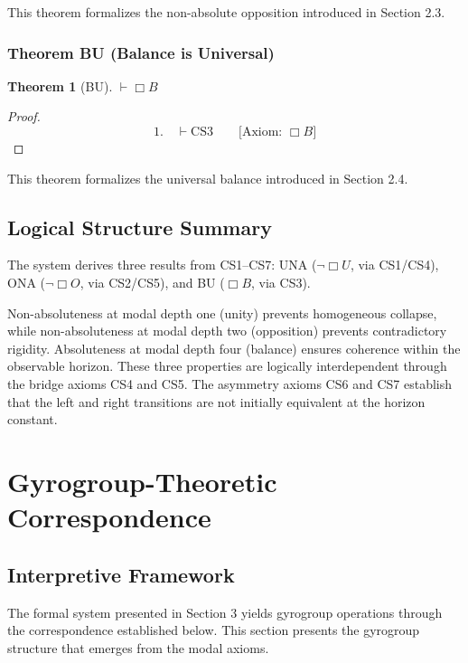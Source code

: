 \documentclass[11pt,a4paper]{article}
\newtheorem{theorem}{Theorem}
\theoremstyle{definition}
\theoremstyle{remark}
\begin{document}
This theorem formalizes the non-absolute opposition introduced in Section 2.3.

\subsubsection{Theorem BU (Balance is Universal)}

\begin{theorem}[BU]
$\vdash \Box B$
\end{theorem}

\begin{proof}
\begin{equation}
1. \quad \vdash \text{CS3} \qquad \text{[Axiom: } \Box B\text{]}
\end{equation}
\end{proof}

This theorem formalizes the universal balance introduced in Section 2.4.

\subsection{Logical Structure Summary}

The system derives three results from CS1–CS7: UNA ($\neg\Box U$, via CS1/CS4), ONA ($\neg\Box O$, via CS2/CS5), and BU ($\Box B$, via CS3).

Non-absoluteness at modal depth one (unity) prevents homogeneous collapse, while non-absoluteness at modal depth two (opposition) prevents contradictory rigidity. Absoluteness at modal depth four (balance) ensures coherence within the observable horizon. These three properties are logically interdependent through the bridge axioms CS4 and CS5. The asymmetry axioms CS6 and CS7 establish that the left and right transitions are not initially equivalent at the horizon constant.

\section{Gyrogroup-Theoretic Correspondence}

\subsection{Interpretive Framework}

The formal system presented in Section 3 yields gyrogroup operations through the correspondence established below. This section presents the gyrogroup structure that emerges from the modal axioms.
\end{document}
